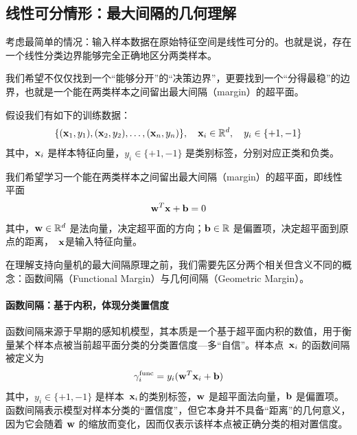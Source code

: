\subsection{线性可分情形：最大间隔的几何理解}

考虑最简单的情况：输入样本数据在原始特征空间是线性可分的。也就是说，存在一个线性分类边界能够完全正确地区分两类样本。

我们希望不仅仅找到一个“能够分开”的“决策边界”，更要找到一个“分得最稳”的边界，也就是一个能在两类样本之间留出最大间隔（margin）的超平面。

假设我们有如下的训练数据：
\[
\{({\bf x}_1, y_1), ({\bf x}_2, y_2), \dots, ({\bf x}_n, y_n)\}, \quad {\bf x}_i \in \mathbb{R}^d, \quad y_i \in \{+1, -1\}
\]
其中，${\bf x}_i$ 是样本特征向量，$y_i\in \{+1, -1\}$ 是类别标签，分别对应正类和负类。

我们希望学习一个能在两类样本之间留出最大间隔（margin）的超平面，即线性平面
\begin{equation}\label{hyper_plane}
{\bf w}^T {\bf x} + {\bf b}  = 0
\end{equation}
其中，${\bf w} \in \mathbb{R}^d$ 是法向量，决定超平面的方向；${\bf b} \in \mathbb{R}$ 是偏置项，决定超平面到原点的距离，~${\bf x}$是输入特征向量。



在理解支持向量机的最大间隔原理之前，我们需要先区分两个相关但含义不同的概念：函数间隔（Functional Margin）与几何间隔（Geometric Margin）。

\paragraph*{函数间隔：基于内积，体现分类置信度}

函数间隔来源于早期的感知机模型，其本质是一个基于超平面内积的数值，用于衡量某个样本点被当前超平面分类的分类置信度---多“自信”。样本点~${\bf x}_i$ 的函数间隔被定义为
\begin{equation}\label{eq:func_margin}
\gamma_i^{\text{func}} = y_i({\bf w}^T {\bf x}_i + {\bf b} )
\end{equation}
其中，$y_i \in \{+1, -1\}$ 是样本~${\bf x}_i$的类别标签，${\bf w}$ 是超平面法向量，${\bf b}$ 是偏置项。函数间隔表示模型对样本分类的“置信度”，但它本身并不具备“距离”的几何意义，因为它会随着 ${\bf w}$ 的缩放而变化，因而仅表示该样本点被正确分类的相对置信度。

